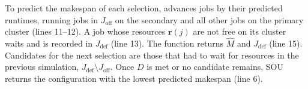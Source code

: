 To predict the makespan of each selection,  advances jobs by their predicted runtimes, running jobs in $J_\mathrm{off}$ on the secondary and all other jobs on the primary cluster (lines 11--12). A job whose resources $\mathbf r(j)$ are not free on its cluster waits and is recorded in $J_\mathrm{def}$ (line 13). The function returns $\hat M$ and $J_\mathrm{def}$ (line 15). Candidates for the next selection are those that had to wait for resources in the previous simulation, $J_\mathrm{def}\setminus J_\mathrm{off}$. Once $D$ is met or no candidate remains, SOU returns the configuration with the lowest predicted makespan (line 6).






